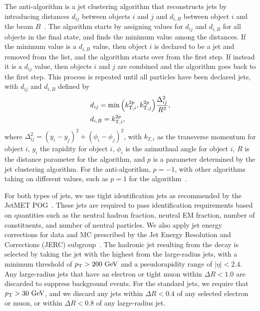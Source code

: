 The anti-\kt algorithm is a jet clustering algorithm that reconstructs jets by introducing distances $d_{ij}$ between objects $i$ and $j$ and $d_{i,B}$ between object $i$ and the beam $B$~\cite{Cacciari_2008}.
The algorithm starts by assigning values for $d_{ij}$ and $d_{i,B}$ for all objects in the final state, and finds the minimum value among the distances.
If the minimum value is a $d_{i,B}$ value, then object $i$ is declared to be a jet and removed from the list, and the algorithm starts over from the first step.
If instead it is a $d_{ij}$ value, then objects $i$ and $j$ are combined and the algorithm goes back to the first step.
This process is repeated until all particles have been declared jets, with $d_{ij}$ and $d_{i,B}$ defined by
\begin{align}
  & d_{ij}=\min\pqty{k_{\mathrm{T},i}^{2p},k_{\mathrm{T},j}^{2p}}\frac{\Delta_{ij}^2}{R^2},\\
  & d_{i,B}=k_{\mathrm{T},i}^{2p},
\end{align}
where $\Delta_{ij}^2=(y_i-y_j)^2+(\phi_i-\phi_j)^2$, with $k_{T,i}$ as the transverse momentum for object $i$, $y_i$ the rapidity for object $i$, $\phi_i$ is the azimuthual angle for object $i$, $R$ is the distance parameter for the algorithm, and $p$ is a parameter determined by the jet clustering algorithm.
For the anti-\kt algorithm, $p=-1$, with other algorithms taking on different values, such as $p=1$ for the \kt algorithm~\cite{Marzani_2019}.

For both types of jets, we use tight identification jets as recommended by the JetMET POG~\cite{jetID2016,jetID2017,jetID2018}.
These jets are required to pass identification requirements based on quantities such as the neutral hadron fraction, neutral EM fraction, number of constituents, and number of neutral particles.
We also apply jet energy corrections for data and MC prescribed by the Jet Energy Resolution and Corrections (JERC) subgroup~\cite{JetEnergyScale}.
The hadronic jet resulting from the \VorH decay is selected by taking the jet with the highest \pt from the large-radius jets, with a minimum threshold of $\pt>200\unit{GeV}$ and a pseudorapidity range of $|\eta|<2.4$.
Any large-radius jets that have an electron or tight muon within $\Delta R<1.0$ are discarded to suppress background events.
For the standard jets, we require that $\pt>30\unit{GeV}$, and we discard any jets within $\Delta R<0.4$ of any selected electron or muon, or within $\Delta R<0.8$ of any large-radius jet.


